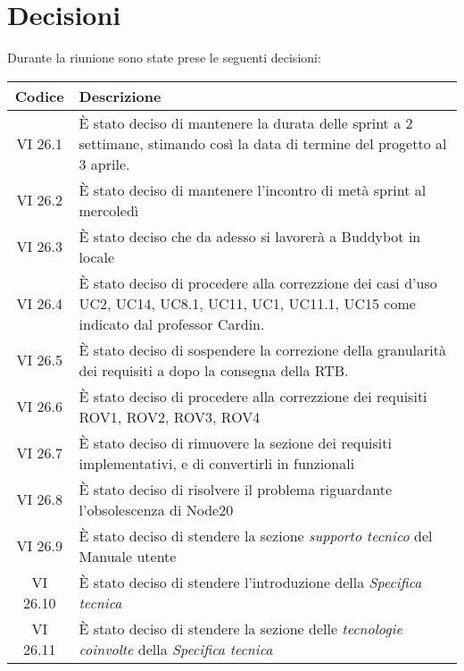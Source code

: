 
\section{Decisioni}

Durante la riunione sono state prese le seguenti decisioni:

\vspace{0.5cm}

\begin{table}[htbp]
    \centering
    \begin{tabular}{|c|p{}|}
        \hline
        \rowcolor[gray]{0.75}
        \textbf{Codice} & \textbf{Descrizione}\\
        \hline
        VI 26.1 & È stato deciso di mantenere la durata delle sprint a 2 settimane, stimando così la data di termine del progetto al 3 aprile. \\
        \hline
        VI 26.2 & È stato deciso di mantenere l'incontro di metà sprint al mercoledì \\
        \hline
        VI 26.3 & È stato deciso che da adesso si lavorerà a Buddybot in locale \\
        \hline
        VI 26.4 & È stato deciso di procedere alla correzzione dei casi d'uso UC2, UC14, UC8.1, UC11, UC1, UC11.1, UC15 come indicato dal professor Cardin. \\
        \hline
        VI 26.5 & È stato deciso di sospendere la correzione della granularità dei requisiti a dopo la consegna della RTB. \\
        \hline
        VI 26.6 & È stato deciso di procedere alla correzzione dei requisiti ROV1, ROV2, ROV3, ROV4 \\
        \hline
        VI 26.7 & È stato deciso di rimuovere la sezione dei requisiti implementativi, e di convertirli in funzionali \\
        \hline
        VI 26.8 & È stato deciso di risolvere il problema riguardante l'obsolescenza di Node20 \\
        \hline
        VI 26.9 & È stato deciso di stendere la sezione \emph{supporto tecnico}  del Manuale utente \\
        \hline
        VI 26.10 & È stato deciso di stendere l'introduzione  della \emph{Specifica tecnica} \\
        \hline
        VI 26.11 & È stato deciso di stendere la sezione delle \emph{tecnologie coinvolte}  della \emph{Specifica tecnica} \\

\end{tabular}
\end{table}
